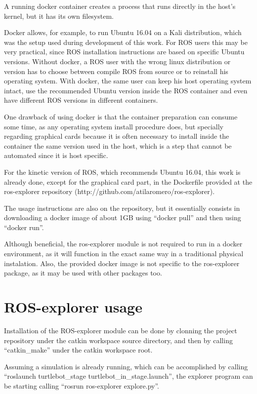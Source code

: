 \documentclass[a4paper,twocolumn]{article}
\begin{document}
    A running docker container creates a process that runs directly in the host's kernel, but it has its own filesystem. 

    Docker allows, for example, to run Ubuntu 16.04 on a Kali distribution, which was the setup used during development of this work. For ROS users this may be very practical, since ROS installation instructions are based on specific Ubuntu versions. Without docker, a ROS user with the wrong linux distribution or version has to choose between compile ROS from source or to reinstall his operating system. With docker, the same user can keep his host operating system intact, use the recommended Ubuntu version inside the ROS container and even have different ROS versions in different containers.

    One drawback of using docker is that the container preparation can consume some time, as any operating system install procedure does, but specially regarding graphical cards because it is often necessary to install inside the container the same version used in the host, which is a step that cannot be automated since it is host specific.

    For the kinetic version of ROS, which recommends Ubuntu 16.04, this work is already done, except for the graphical card part, in the Dockerfile provided at the ros-explorer repository (http://github.com/atilaromero/ros-explorer).

    The usage instructions are also on the repository, but it essentially consists in downloading a docker image of about 1GB using ``docker pull'' and then using ``docker run''.

    Although beneficial, the ros-explorer module is not required to run in a docker environment, as it will function in the exact same way in a traditional physical instalation. Also, the provided docker image is not specific to the ros-explorer package, as it may be used with other packages too.

\section{ROS-explorer usage}
    Installation of the ROS-explorer module can be done by clonning the project repository under the catkin workspace source directory, and then by calling ``catkin\_make'' under the catkin workspace root.

    Assuming a simulation is already running, which can be accomplished by calling ``roslaunch turtlebot\_stage turtlebot\_in\_stage.launch'', the explorer program can be starting calling ``rosrun ros-explorer explore.py''.
\end{document}
